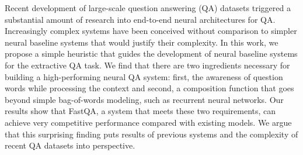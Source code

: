 Recent development of large-scale question answering (QA) datasets triggered a substantial amount of research into end-to-end neural architectures for QA. Increasingly complex systems have been conceived without comparison to simpler neural baseline systems that would justify their complexity. In this work, we propose a simple heuristic that guides the development of neural baseline systems for the extractive QA task. We find that there are two ingredients necessary for building a high-performing neural QA system: first, the awareness of question words while processing the context and second, a composition function that goes beyond simple bag-of-words modeling, such as recurrent neural networks. Our results show that FastQA, a system that meets these two requirements, can achieve very competitive performance compared with existing models. We argue that this surprising finding puts results of previous systems and the complexity of recent QA datasets into perspective.
